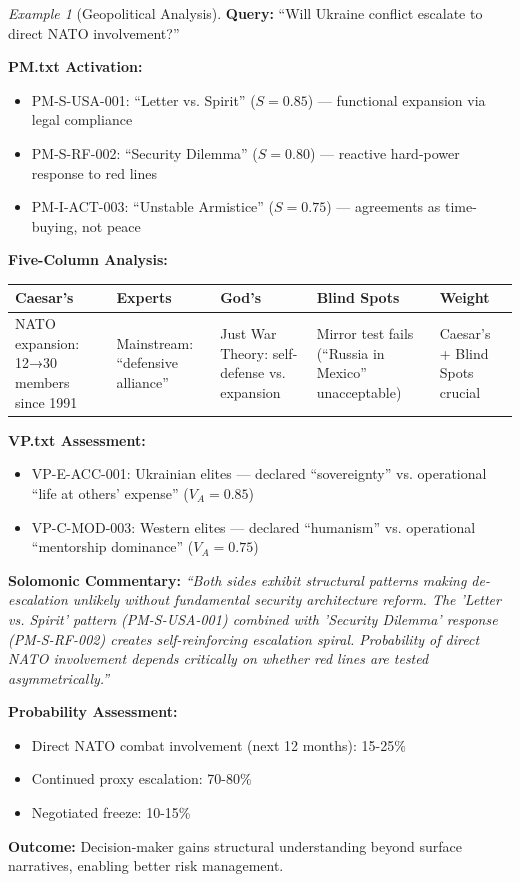 \documentclass[11pt,a4paper]{article}
\theoremstyle{definition}
\theoremstyle{remark}
\newtheorem{example}{Example}[section]
\begin{document}
\begin{example}[Geopolitical Analysis]
\textbf{Query:} ``Will Ukraine conflict escalate to direct NATO involvement?''

\textbf{PM.txt Activation:}
\begin{itemize}
    \item PM-S-USA-001: ``Letter vs. Spirit'' ($S=0.85$) — functional expansion via legal compliance
    \item PM-S-RF-002: ``Security Dilemma'' ($S=0.80$) — reactive hard-power response to red lines
    \item PM-I-ACT-003: ``Unstable Armistice'' ($S=0.75$) — agreements as time-buying, not peace
\end{itemize}

\textbf{Five-Column Analysis:}
\begin{center}
\scriptsize
\begin{tabular}{|p{2.3cm}|p{2.3cm}|p{2.3cm}|p{2.3cm}|p{2cm}|}
\hline
\textbf{Caesar's} & \textbf{Experts} & \textbf{God's} & \textbf{Blind Spots} & \textbf{Weight} \\
\hline
NATO expansion: 12→30 members since 1991 & Mainstream: ``defensive alliance'' & Just War Theory: self-defense vs. expansion & Mirror test fails (``Russia in Mexico'' unacceptable) & Caesar's + Blind Spots crucial \\
\hline
\end{tabular}
\end{center}

\textbf{VP.txt Assessment:}
\begin{itemize}
    \item VP-E-ACC-001: Ukrainian elites — declared ``sovereignty'' vs. operational ``life at others' expense'' ($V_A=0.85$)
    \item VP-C-MOD-003: Western elites — declared ``humanism'' vs. operational ``mentorship dominance'' ($V_A=0.75$)
\end{itemize}

\textbf{Solomonic Commentary:}
\textit{``Both sides exhibit structural patterns making de-escalation unlikely without fundamental security architecture reform. The 'Letter vs. Spirit' pattern (PM-S-USA-001) combined with 'Security Dilemma' response (PM-S-RF-002) creates self-reinforcing escalation spiral. Probability of direct NATO involvement depends critically on whether red lines are tested asymmetrically.''}

\textbf{Probability Assessment:}
\begin{itemize}
    \item Direct NATO combat involvement (next 12 months): 15-25\%
    \item Continued proxy escalation: 70-80\%
    \item Negotiated freeze: 10-15\%
\end{itemize}

\textbf{Outcome:} Decision-maker gains structural understanding beyond surface narratives, enabling better risk management.
\end{example}
\end{document}
